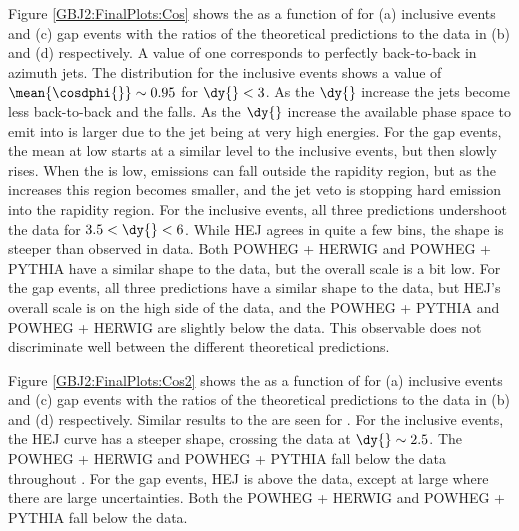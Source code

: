 
Figure \ref{GBJ2:FinalPlots:Cos} shows the \mean{\cosdphi{}} as a function of \dy{} for (a) inclusive events and (c) gap events with the ratios of the theoretical predictions to the data in (b) and (d) respectively. 
A \mean{\cosdphi{}} value of one corresponds to perfectly back-to-back in azimuth jets.
The \mean{\cosdphi{}} distribution for the inclusive events shows a value of $ \mean{\cosdphi{}}\sim0.95$ for $\dy{}<3$.
As the $\dy{}$ increase the jets become less back-to-back and the \mean{\cosdphi{}} falls.
As the $\dy{}$ increase the available phase space to emit into is larger due to the jet being at very high energies.
For the gap events, the mean{\cosdphi{}} at low \dy{} starts at a similar level to the inclusive events, but then slowly rises.
When the \dy{} is low, emissions can fall outside the rapidity region, but as the \dy{} increases this region becomes smaller, and the jet veto is stopping hard emission into the rapidity region.
For the inclusive events, all three predictions undershoot the data for $3.5<\dy{}<6$.
While HEJ agrees in quite a few bins, the shape is steeper than observed in data.
Both POWHEG + HERWIG and POWHEG + PYTHIA have a similar shape to the data, but the overall scale is a bit low.
For the gap events, all three predictions have a similar shape to the data, but HEJ's overall scale is on the high side of the data, and the POWHEG + PYTHIA and  POWHEG + HERWIG are slightly below the data.
This observable does not discriminate well between the different theoretical predictions. 

Figure \ref{GBJ2:FinalPlots:Cos2} shows the \mean{\costwodphi{}} as a function of \dy{} for (a) inclusive events and (c) gap events with the ratios of the theoretical predictions to the data in (b) and (d) respectively. 
Similar results to the \mean{\cosdphi{}} are seen for \mean{\costwodphi{}}.
For the inclusive events, the HEJ curve has a steeper shape, crossing the data at $\dy{}\sim2.5$. 
The POWHEG + HERWIG and POWHEG + PYTHIA fall below the data throughout \dy{}.
For the gap events, HEJ is above the data, except at large \dy{} where there are large uncertainties.
Both the POWHEG + HERWIG and POWHEG + PYTHIA fall below the data.

